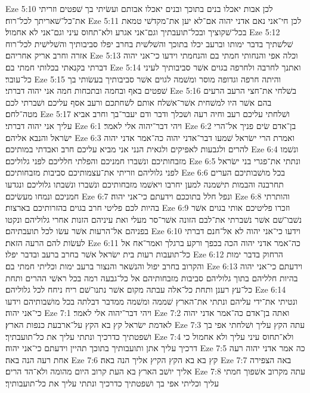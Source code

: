 Eze 5:10  לכן אבות יאכלו בנים בתוכך ובנים יאכלו אבותם ועשׂיתי בך שׁפטים וזריתי את־כל־שׁאריתך לכל־רוח׃
Eze 5:11  לכן חי־אני נאם אדני יהוה אם־לא יען את־מקדשׁי טמאת בכל־שׁקוציך ובכל־תועבתיך וגם־אני אגרע ולא־תחוס עיני וגם־אני לא אחמול׃
Eze 5:12  שׁלשׁתיך בדבר ימותו וברעב יכלו בתוכך והשׁלשׁית בחרב יפלו סביבותיך והשׁלישׁית לכל־רוח אזרה וחרב אריק אחריהם׃
Eze 5:13  וכלה אפי והנחותי חמתי בם והנחמתי וידעו כי־אני יהוה דברתי בקנאתי בכלותי חמתי בם׃
Eze 5:14  ואתנך לחרבה ולחרפה בגוים אשׁר סביבותיך לעיני כל־עובר׃
Eze 5:15  והיתה חרפה וגדופה מוסר ומשׁמה לגוים אשׁר סביבותיך בעשׂותי בך שׁפטים באף ובחמה ובתכחות חמה אני יהוה דברתי׃
Eze 5:16  בשׁלחי את־חצי הרעב הרעים בהם אשׁר היו למשׁחית אשׁר־אשׁלח אותם לשׁחתכם ורעב אסף עליכם ושׁברתי לכם מטה־לחם׃
Eze 5:17  ושׁלחתי עליכם רעב וחיה רעה ושׁכלך ודבר ודם יעבר־בך וחרב אביא עליך אני יהוה דברתי׃
Eze 6:1  ויהי דבר־יהוה אלי לאמר׃
Eze 6:2  בן־אדם שׂים פניך אל־הרי ישׂראל והנבא אליהם׃
Eze 6:3  ואמרת הרי ישׂראל שׁמעו דבר־אדני יהוה כה־אמר אדני יהוה להרים ולגבעות לאפיקים ולגאית הנני אני מביא עליכם חרב ואבדתי במותיכם׃
Eze 6:4  ונשׁמו מזבחותיכם ונשׁברו חמניכם והפלתי חלליכם לפני גלוליכם׃
Eze 6:5  ונתתי את־פגרי בני ישׂראל לפני גלוליהם וזריתי את־עצמותיכם סביבות מזבחותיכם׃
Eze 6:6  בכל מושׁבותיכם הערים תחרבנה והבמות תישׁמנה למען יחרבו ויאשׁמו מזבחותיכם ונשׁברו ונשׁבתו גלוליכם ונגדעו חמניכם ונמחו מעשׂיכם׃
Eze 6:7  ונפל חלל בתוככם וידעתם כי־אני יהוה׃
Eze 6:8  והותרתי בהיות לכם פליטי חרב בגוים בהזרותיכם בארצות׃
Eze 6:9  וזכרו פליטיכם אותי בגוים אשׁר נשׁבו־שׁם אשׁר נשׁברתי את־לבם הזונה אשׁר־סר מעלי ואת עיניהם הזנות אחרי גלוליהם ונקטו בפניהם אל־הרעות אשׁר עשׂו לכל תועבתיהם׃
Eze 6:10  וידעו כי־אני יהוה לא אל־חנם דברתי לעשׂות להם הרעה הזאת׃
Eze 6:11  כה־אמר אדני יהוה הכה בכפך ורקע ברגלך ואמר־אח אל כל־תועבות רעות בית ישׂראל אשׁר בחרב ברעב ובדבר יפלו׃
Eze 6:12  הרחוק בדבר ימות והקרוב בחרב יפול והנשׁאר והנצור ברעב ימות וכליתי חמתי בם׃
Eze 6:13  וידעתם כי־אני יהוה בהיות חלליהם בתוך גלוליהם סביבות מזבחותיהם אל כל־גבעה רמה בכל ראשׁי ההרים ותחת כל־עץ רענן ותחת כל־אלה עבתה מקום אשׁר נתנו־שׁם ריח ניחח לכל גלוליהם׃
Eze 6:14  ונטיתי את־ידי עליהם ונתתי את־הארץ שׁממה ומשׁמה ממדבר דבלתה בכל מושׁבותיהם וידעו כי־אני יהוה׃
Eze 7:1  ויהי דבר־יהוה אלי לאמר׃
Eze 7:2  ואתה בן־אדם כה־אמר אדני יהוה לאדמת ישׂראל קץ בא הקץ על־ארבעת כנפות הארץ׃
Eze 7:3  עתה הקץ עליך ושׁלחתי אפי בך ושׁפטתיך כדרכיך ונתתי עליך את כל־תועבתיך׃
Eze 7:4  ולא־תחוס עיני עליך ולא אחמול כי דרכיך עליך אתן ותועבותיך בתוכך תהיין וידעתם כי־אני יהוה׃
Eze 7:5  כה אמר אדני יהוה רעה אחת רעה הנה באה׃
Eze 7:6  קץ בא בא הקץ הקיץ אליך הנה באה׃
Eze 7:7  באה הצפירה אליך יושׁב הארץ בא העת קרוב היום מהומה ולא־הד הרים׃
Eze 7:8  עתה מקרוב אשׁפוך חמתי עליך וכליתי אפי בך ושׁפטתיך כדרכיך ונתתי עליך את כל־תועבותיך׃

